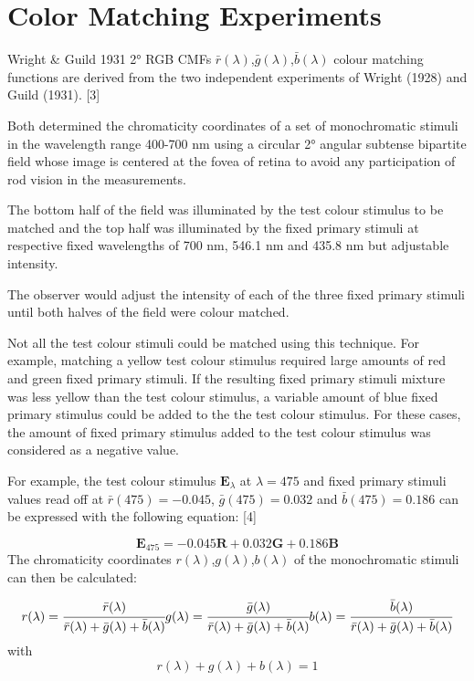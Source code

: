 \section{Color Matching Experiments}
\label{sec:color-matching-experiments}

Wright & Guild 1931 2° RGB CMFs $\bar{r}(\lambda)$,$\bar{g}(\lambda)$,$\bar{b}(\lambda)$ colour matching functions are derived from the two independent experiments of Wright (1928) and Guild (1931). [3]

Both determined the chromaticity coordinates of a set of monochromatic stimuli in the wavelength range 400-700 nm using a circular 2° angular subtense bipartite field whose image is centered at the fovea of retina to avoid any participation of rod vision in the measurements.

The bottom half of the field was illuminated by the test colour stimulus to be matched and the top half was illuminated by the fixed primary stimuli at respective fixed wavelengths of 700 nm, 546.1 nm and 435.8 nm but adjustable intensity.

The observer would adjust the intensity of each of the three fixed primary stimuli until both halves of the field were colour matched.

Not all the test colour stimuli could be matched using this technique. For example, matching a yellow test colour stimulus required large amounts of red and green fixed primary stimuli. If the resulting fixed primary stimuli mixture was less yellow than the test colour stimulus, a variable amount of blue fixed primary stimulus could be added to the the test colour stimulus. For these cases, the amount of fixed primary stimulus added to the test colour stimulus was considered as a negative value.

For example, the test colour stimulus $\textbf{E}_\lambda$ at $\lambda=475$ and fixed primary stimuli values read off at $\bar{r}(475)=-0.045$, $\bar{g}(475)=0.032$ and $\bar{b}(475)=0.186$ can be expressed with the following equation: [4]

$$
\begin{equation}
\textbf{E}_{475}=-0.045\textbf{R}+0.032\textbf{G}+0.186\textbf{B}
\end{equation}
$$
The chromaticity coordinates $r(\lambda)$,$g(\lambda)$,$b(\lambda)$ of the monochromatic stimuli can then be calculated:

$$
\begin{equation}
r(\lambda)=\cfrac{\bar{r}(\lambda)}{\bar{r}(\lambda)+\bar{g}(\lambda)+\bar{b}(\lambda)}\\
g(\lambda)=\cfrac{\bar{g}(\lambda)}{\bar{r}(\lambda)+\bar{g}(\lambda)+\bar{b}(\lambda)}\\
b(\lambda)=\cfrac{\bar{b}(\lambda)}{\bar{r}(\lambda)+\bar{g}(\lambda)+\bar{b}(\lambda)}
\end{equation}
$$
with $$
\begin{equation}
r(\lambda)+g(\lambda)+b(\lambda)=1
\end{equation}
$$